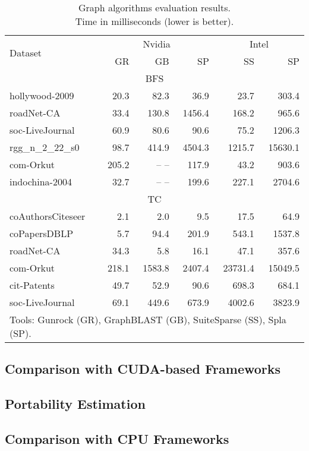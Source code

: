 \begin{table}[tbp]
\caption{Graph algorithms evaluation results.\\Time in milliseconds (lower is better).} 
\begin{center}
    \begin{tabular}{|l|r|r|r|r|r|}
    \hline
    \multirow{2}{*}{Dataset} & \multicolumn{3}{c|}{Nvidia} & \multicolumn{2}{c|}{Intel} \\
    \cline{2-6}
    & GR & GB & SP & SS & SP \\
    \hline
    \hline
    \multicolumn{6}{|c|}{BFS} \\
    \hline
    \rowcolor{black!10} hollywood-2009    &  20.3 &  82.3 &   36.9 &   23.7 &   303.4 \\
    \rowcolor{black!2 } roadNet-CA        &  33.4 & 130.8 & 1456.4 &  168.2 &   965.6 \\
    \rowcolor{black!10} soc-LiveJournal   &  60.9 &  80.6 &   90.6 &   75.2 &  1206.3 \\
    \rowcolor{black!2 } rgg\_n\_2\_22\_s0 &  98.7 & 414.9 & 4504.3 & 1215.7 & 15630.1 \\
    \rowcolor{black!10} com-Orkut         & 205.2 & -- -- &  117.9 &   43.2 &   903.6 \\
    \rowcolor{black!2 } indochina-2004    &  32.7 & -- -- &  199.6 &  227.1 &  2704.6 \\
    \hline
    \hline
    \multicolumn{6}{|c|}{TC} \\
    \hline
    \rowcolor{black!10} coAuthorsCiteseer &   2.1 &    2.0 &    9.5 &    17.5 &    64.9 \\
    \rowcolor{black!2 } coPapersDBLP      &   5.7 &   94.4 &  201.9 &   543.1 &  1537.8 \\
    \rowcolor{black!10} roadNet-CA        &  34.3 &    5.8 &   16.1 &    47.1 &   357.6 \\
    \rowcolor{black!2 } com-Orkut         & 218.1 & 1583.8 & 2407.4 & 23731.4 & 15049.5 \\
    \rowcolor{black!10} cit-Patents       &  49.7 &   52.9 &   90.6 &   698.3 &   684.1 \\
    \rowcolor{black!2 } soc-LiveJournal   &  69.1 &  449.6 &  673.9 &  4002.6 &  3823.9 \\
    \hline
    \hline
    \multicolumn{6}{l}{Tools: Gunrock (GR), GraphBLAST (GB), SuiteSparse (SS), Spla (SP).} \\
    \end{tabular}
    \label{results}
\end{center}
\end{table}
 
\subsection{Comparison with CUDA-based Frameworks}
\subsection{Portability Estimation}
\subsection{Comparison with CPU Frameworks}
